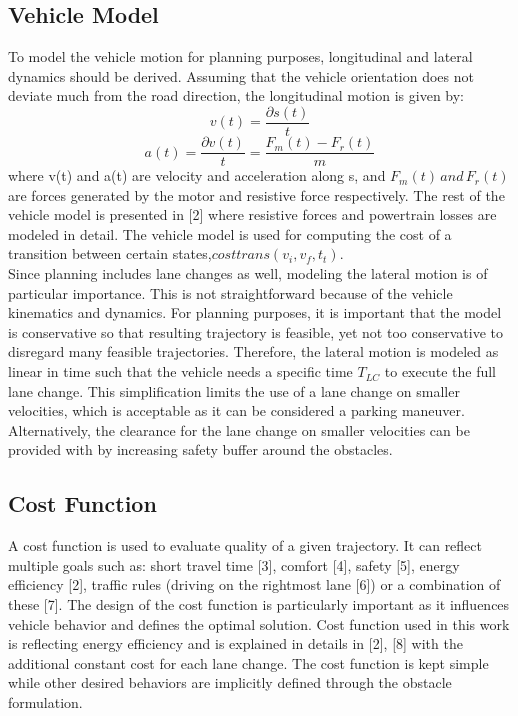 \documentclass{report}
\begin{document}
 \subsection{Vehicle Model}
 To model the vehicle motion for planning purposes, longitudinal and lateral dynamics should be derived. Assuming
 that the vehicle orientation does not deviate much from the road direction, the longitudinal motion is given by:
 \begin{equation}
 v(t) = \frac{\partial s(t)}{t}
 \end{equation}
 \begin{equation}
  a(t) = \frac{\partial v(t)}{t} = \frac{F_m(t) - F_r(t)}{m}
 \end{equation}
 where v(t) and a(t) are velocity and acceleration along s, and $F_m(t) \,and\, F_r (t) $are forces generated by the motor and resistive force respectively. The rest of the vehicle model is presented in [2] where resistive forces and powertrain losses are modeled in detail. The vehicle model is used for computing the cost of a transition between certain states,$costtrans(v_i , v_f , t_t )$.\\
 \indent
 Since planning includes lane changes as well, modeling the lateral motion is of particular importance. This is not straightforward because of the vehicle kinematics and dynamics. For planning purposes, it is important that the model is conservative so that resulting trajectory is feasible, yet not too conservative to disregard many feasible trajectories. Therefore, the lateral motion is modeled as linear in time such that the vehicle needs a specific time $T _{LC}$ to execute the full lane change. This simplification limits the use of a lane change on smaller velocities, which is acceptable as it can be considered a parking maneuver. Alternatively, the clearance for the lane change on smaller velocities can be provided with by increasing safety buffer around the obstacles.
 \subsection{Cost Function}
 A cost function is used to evaluate quality of a given trajectory. It can reflect multiple goals such as: short travel time [3], comfort [4], safety [5], energy efficiency [2], traffic rules (driving on the rightmost lane [6]) or a combination of these [7]. The design of the cost function is particularly important as it influences vehicle behavior and defines the optimal solution. Cost function used in this work is reflecting energy efficiency and is explained in details in [2], [8] with the additional constant cost for each lane change. The cost function is kept simple while other desired behaviors are implicitly defined through the obstacle formulation.
\end{document}
